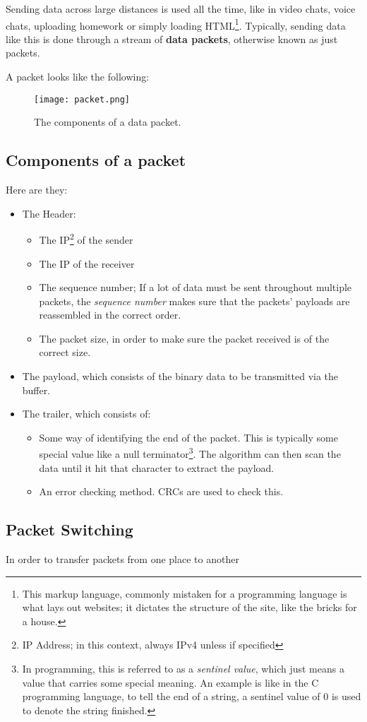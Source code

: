 \documentclass[../main.tex]{subfiles}
\begin{document}
Sending data across large distances is used all the time, like in video chats, voice chats, uploading homework or simply loading HTML\footnote{This markup language, commonly mistaken for a programming language is what lays out websites; it dictates the structure of the site, like the bricks for a house.}. Typically, sending data like this is done through a stream of \textbf{data packets}, otherwise known as just packets.

A packet looks like the following:

\begin{figure}[h]
    \centering
    \texttt{[image: packet.png]}
    \caption{The components of a data packet.}
    \label{fig:packet}
\end{figure}

\subsection{Components of a packet}

Here are they:

\begin{itemize}

\item The Header:
    \begin{itemize}
    \item The IP\footnote{IP Address; in this context, always IPv4 unless if specified} of the sender
    \item The IP of the receiver
    \item The sequence number; If a lot of data must be sent throughout multiple packets, the
          \emph{sequence number} makes sure that the packets' payloads are reassembled in the correct order.
    \item The packet size, in order to make sure the packet received is of the correct size.
    \end{itemize}

\item The payload, which consists of the binary data to be transmitted via the buffer.

\item The trailer, which consists of:
    \begin{itemize}

    \item Some way of identifying the end of the packet. This is typically some special value like a null terminator\footnote{In programming,
          this is referred to as a \emph{sentinel value}, which just means a value that carries some special meaning. An example is like in the
          C programming language, to tell the end of a string, a sentinel value of 0 is used to denote the string finished.}. The algorithm can
          then scan the data until it hit that character to extract the payload.
    \item An error checking method. CRCs are used to check this.
    
    \end{itemize}

\end{itemize}

\subsection{Packet Switching}

In order to transfer packets from one place to another
\end{document}
